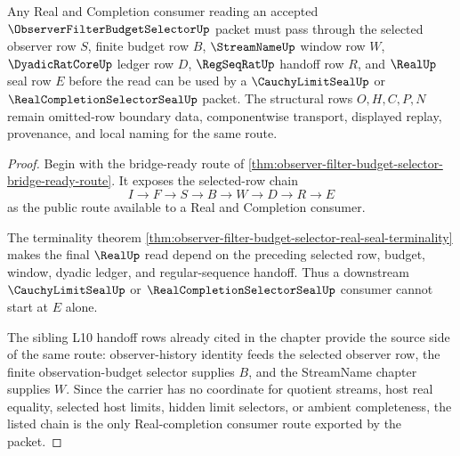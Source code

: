 \begin{theorem}
\label{thm:observer-filter-budget-selector-real-completion-consumer}
Any Real and Completion consumer reading an accepted $\ObserverFilterBudgetSelectorUp$ packet must pass through the selected observer row $S$, finite budget row $B$, $\StreamNameUp$ window row $W$, $\DyadicRatCoreUp$ ledger row $D$, $\RegSeqRatUp$ handoff row $R$, and $\RealUp$ seal row $E$ before the read can be used by a $\CauchyLimitSealUp$ or $\RealCompletionSelectorSealUp$ packet. The structural rows $O,H,C,P,N$ remain omitted-row boundary data, componentwise transport, displayed replay, provenance, and local naming for the same route.
\end{theorem}
\begin{proof}
Begin with the bridge-ready route of \autoref{thm:observer-filter-budget-selector-bridge-ready-route}. It exposes the selected-row chain
$$
I \to F \to S \to B \to W \to D \to R \to E
$$
as the public route available to a Real and Completion consumer.

The terminality theorem \autoref{thm:observer-filter-budget-selector-real-seal-terminality} makes the final $\RealUp$ read depend on the preceding selected row, budget, window, dyadic ledger, and regular-sequence handoff. Thus a downstream $\CauchyLimitSealUp$ or $\RealCompletionSelectorSealUp$ consumer cannot start at $E$ alone.

The sibling L10 handoff rows already cited in the chapter provide the source side of the same route: observer-history identity feeds the selected observer row, the finite observation-budget selector supplies $B$, and the StreamName chapter supplies $W$. Since the carrier has no coordinate for quotient streams, host real equality, selected host limits, hidden limit selectors, or ambient completeness, the listed chain is the only Real-completion consumer route exported by the packet.
\end{proof}

